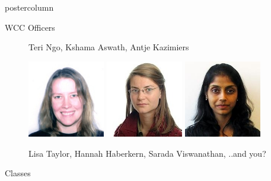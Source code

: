 \documentclass{beamer}
\begin{document}
\begin{frame}
\begin{columns}
\begin{column}{.33\textwidth}
\begin{beamercolorbox}[center,wd=\textwidth]{postercolumn}
\begin{minipage}[T]{.95\textwidth}
{\begin{myblock}{WCC Officers}
\begin{addmargin}[1em]{1em}
\begin{figure}
                                \caption{Teri Ngo, Kshama Aswath, Antje Kazimiers}
                                \label{fig:workspace}
                                \vspace{1.3cm}
                            \end{figure}
                            \begin{figure}
                                \centering\includegraphics[width=0.3\textwidth]{img/lisa.png}
                                \centering\includegraphics[width=0.3\textwidth]{img/hannah.jpg}
                                \centering\includegraphics[width=0.3\textwidth]{img/sarada.jpg}
                                \caption{Lisa Taylor, Hannah Haberkern, Sarada Viswanathan, ..and you?}
                                \label{fig:workspace}
                                \vspace{1.3cm}
                            \end{figure}
                        \end{addmargin}
                    \end{myblock}
                    \vspace{1.25cm}
                    \begin{myblock}{Classes}
                        \begin{addmargin}[1em]{1em}

\end{addmargin}
\end{myblock}}
\end{minipage}
\end{beamercolorbox}
\end{column}
\end{columns}
\end{frame}
\end{document}
